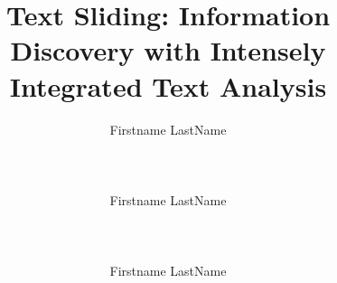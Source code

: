\documentclass{sig-alternate}
\begin{document}
\title{Text Sliding: Information Discovery with Intensely Integrated Text Analysis}

\author{%
\alignauthor Firstname LastName\\
       \\
       \\
       \\
\alignauthor Firstname LastName\\
       \\
       \\
       \\
\alignauthor Firstname LastName\\
       \\
       \\
       \\
}

\maketitle
\end{document}
